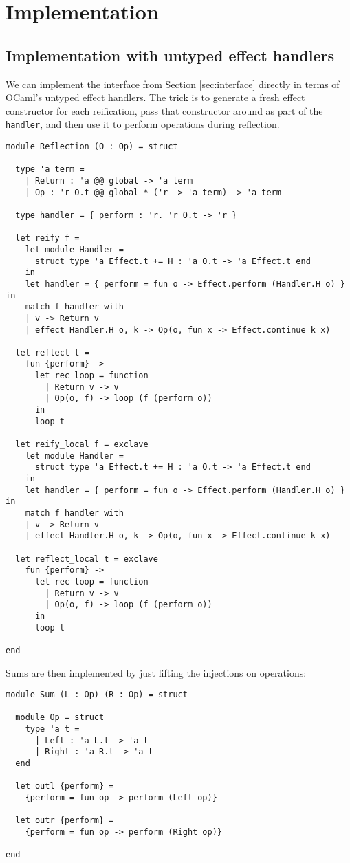 \documentclass[acmsmall, screen, nonacm]{acmart}
\begin{document}
\section{Implementation}
\label{sec:implementation}

\subsection{Implementation with untyped effect handlers}

We can implement the interface from Section \ref{sec:interface} directly
in terms of OCaml's untyped effect
handlers\cite{Sivaramakrishnan2021retrofitting}. The trick is to
generate a fresh effect constructor for each reification, pass that
constructor around as part of the \lstinline[style=ocaml]{handler}, and
then use it to perform operations during reflection.

\begin{lstlisting}[style=ocaml]
module Reflection (O : Op) = struct

  type 'a term =
    | Return : 'a @@ global -> 'a term
    | Op : 'r O.t @@ global * ('r -> 'a term) -> 'a term

  type handler = { perform : 'r. 'r O.t -> 'r }

  let reify f =
    let module Handler =
      struct type 'a Effect.t += H : 'a O.t -> 'a Effect.t end
    in
    let handler = { perform = fun o -> Effect.perform (Handler.H o) } in
    match f handler with
    | v -> Return v
    | effect Handler.H o, k -> Op(o, fun x -> Effect.continue k x)

  let reflect t =
    fun {perform} ->
      let rec loop = function
        | Return v -> v
        | Op(o, f) -> loop (f (perform o))
      in
      loop t

  let reify_local f = exclave
    let module Handler =
      struct type 'a Effect.t += H : 'a O.t -> 'a Effect.t end
    in
    let handler = { perform = fun o -> Effect.perform (Handler.H o) } in
    match f handler with
    | v -> Return v
    | effect Handler.H o, k -> Op(o, fun x -> Effect.continue k x)

  let reflect_local t = exclave
    fun {perform} ->
      let rec loop = function
        | Return v -> v
        | Op(o, f) -> loop (f (perform o))
      in
      loop t

end
\end{lstlisting}
Sums are then implemented by just lifting the injections on operations:
\begin{lstlisting}[style=ocaml]
module Sum (L : Op) (R : Op) = struct

  module Op = struct
    type 'a t =
      | Left : 'a L.t -> 'a t
      | Right : 'a R.t -> 'a t
  end    

  let outl {perform} =
    {perform = fun op -> perform (Left op)}

  let outr {perform} =
    {perform = fun op -> perform (Right op)}

end
\end{lstlisting}
\end{document}
